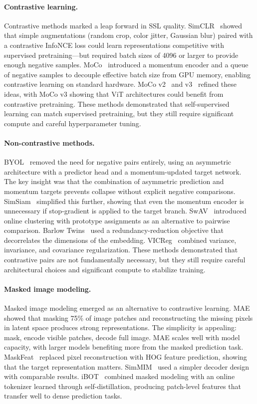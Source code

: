 \documentclass{article}
\begin{document}
\paragraph{Contrastive learning.} Contrastive methods marked a leap forward in SSL quality. SimCLR~\cite{simclr} showed that simple augmentations (random crop, color jitter, Gaussian blur) paired with a contrastive InfoNCE loss could learn representations competitive with supervised pretraining---but required batch sizes of 4096 or larger to provide enough negative samples. MoCo~\cite{moco} introduced a momentum encoder and a queue of negative samples to decouple effective batch size from GPU memory, enabling contrastive learning on standard hardware. MoCo v2~\cite{mocov2} and v3~\cite{mocov3} refined these ideas, with MoCo v3 showing that ViT architectures could benefit from contrastive pretraining. These methods demonstrated that self-supervised learning can match supervised pretraining, but they still require significant compute and careful hyperparameter tuning.

\paragraph{Non-contrastive methods.} BYOL~\cite{byol} removed the need for negative pairs entirely, using an asymmetric architecture with a predictor head and a momentum-updated target network. The key insight was that the combination of asymmetric prediction and momentum targets prevents collapse without explicit negative comparisons. SimSiam~\cite{simsiam} simplified this further, showing that even the momentum encoder is unnecessary if stop-gradient is applied to the target branch. SwAV~\cite{swav} introduced online clustering with prototype assignments as an alternative to pairwise comparison. Barlow Twins~\cite{barlowtwins} used a redundancy-reduction objective that decorrelates the dimensions of the embedding. VICReg~\cite{vicreg} combined variance, invariance, and covariance regularization. These methods demonstrated that contrastive pairs are not fundamentally necessary, but they still require careful architectural choices and significant compute to stabilize training.

\paragraph{Masked image modeling.} Masked image modeling emerged as an alternative to contrastive learning. MAE~\cite{mae} showed that masking 75\% of image patches and reconstructing the missing pixels in latent space produces strong representations. The simplicity is appealing: mask, encode visible patches, decode full image. MAE scales well with model capacity, with larger models benefiting more from the masked prediction task. MaskFeat~\cite{maskfeat} replaced pixel reconstruction with HOG feature prediction, showing that the target representation matters. SimMIM~\cite{simmim} used a simpler decoder design with comparable results. iBOT~\cite{ibot} combined masked modeling with an online tokenizer learned through self-distillation, producing patch-level features that transfer well to dense prediction tasks.
\end{document}
